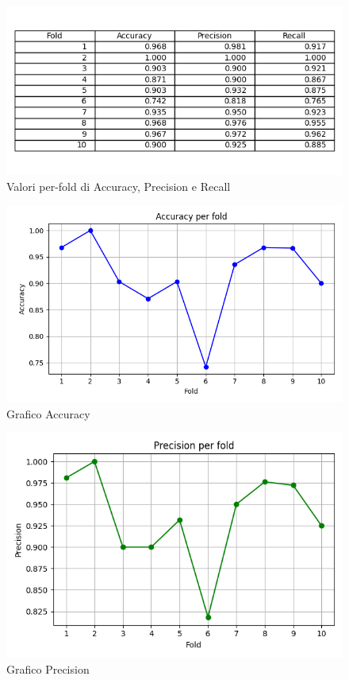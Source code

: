 \documentclass[a4paper,12pt]{report}
\begin{document}
\vspace*{\fill}
\begin{figure}[h]
\centering
\includegraphics[width=14cm]{table.png}
\caption{Valori per-fold di Accuracy, Precision e Recall}
\end{figure}
\vspace*{\fill}
\newpage
\vspace*{\fill}
\begin{figure}[h]
\centering
\includegraphics[width=\textwidth]{accuracy.png}
\caption{Grafico Accuracy}
\end{figure}
\vspace*{\fill}
\newpage
\vspace*{\fill}
\begin{figure}[h]
\centering
\includegraphics[width=\textwidth]{precision.png}
\caption{Grafico Precision}
\end{figure}
\end{document}

